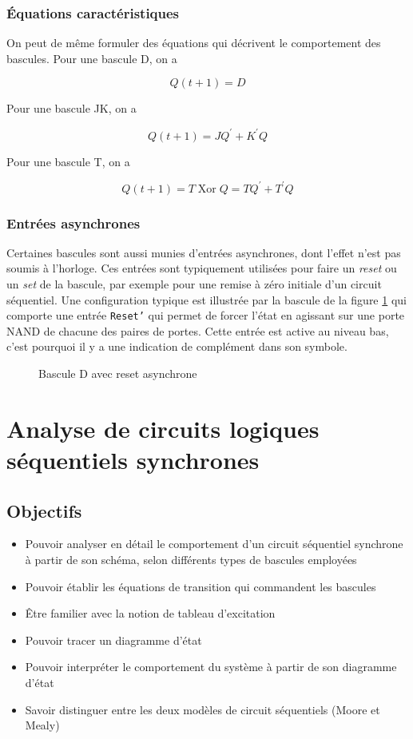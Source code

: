 \documentclass[11pt]{article}
\begin{document}
\subsubsection{Équations caractéristiques}
\label{sec:org4d5c9db}

On peut de même formuler des équations qui décrivent le comportement
des bascules. Pour une bascule D, on a

$$ Q(t+1) = D $$

Pour une bascule JK, on a

$$ Q(t+1) =J Q^\prime + K^\prime Q $$

Pour une bascule T, on a

$$ Q(t+1) = T \operatorname{Xor} Q = T Q^\prime + T^\prime Q $$

\subsubsection{Entrées asynchrones}
\label{sec:org21c9f08}

Certaines bascules sont aussi munies d'entrées asynchrones, dont
l'effet n'est pas soumis à l'horloge. Ces entrées sont typiquement
utilisées pour faire un \emph{reset} ou un \emph{set} de la bascule, par exemple
pour une remise à zéro initiale d'un circuit séquentiel. Une
configuration typique est illustrée par la bascule de la figure
\ref{fig:orgf415be9} qui comporte une entrée \texttt{Reset'} qui
permet de forcer l'état en agissant sur une porte NAND de chacune des
paires de portes. Cette entrée est active au niveau bas, c'est
pourquoi il y a une indication de complément dans son symbole.

\begin{figure}[htbp]
\centering

\caption{\label{fig:orgf415be9}Bascule D avec reset asynchrone}
\end{figure}

\section{Analyse de circuits logiques séquentiels synchrones}
\label{sec:org0de6b92}
\subsection{Objectifs}
\label{sec:org9f7e656}
\begin{itemize}
\item Pouvoir analyser en détail le comportement d'un circuit séquentiel
synchrone à partir de son schéma, selon différents types de bascules
employées
\item Pouvoir établir les équations de transition qui commandent les bascules
\item Être familier avec la notion de tableau d'excitation
\item Pouvoir tracer un diagramme d'état
\item Pouvoir interpréter le comportement du système à partir de son
diagramme d'état
\item Savoir distinguer entre les deux modèles de circuit séquentiels
(Moore et Mealy)
\end{itemize}
\end{document}
